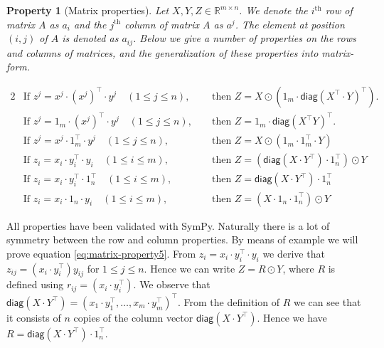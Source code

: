 \documentclass[twoside,11pt]{article}
\newtheorem{property}[theorem]{Property}
\newcommand{\func}[1]{\ensuremath{\textsf{#1}}} %
\newcommand{\Reals}{\mathbb{R}}
\begin{document}
\begin{property}[Matrix properties]
Let $X, Y, Z \in \Reals^{m \times n}$. We denote the $i^\text{th}$ row of matrix $A$ as $a_i$ and the $j^\text{th}$ column of matrix $A$ as $a^j$. The element at position $(i,j)$ of $A$ is denoted as $a_{ij}$. Below we give a number of properties on the rows and columns of matrices, and the generalization of these properties into matrix-form.

\begin{alignat}{2}
&\text{If }
  z^j = x^j \cdot (x^j)^\top \cdot y^j \quad (1 \leq j \leq n),
&&\text{ then }
  Z = X \odot (1_m \cdot \func{diag}(X^\top \cdot Y)^\top).
\label{eq:matrix-property1}
\\  
&\text{If }
  z^j = 1_m \cdot (x^j)^\top \cdot y^j \quad (1 \leq j \leq n),
&&\text{ then }
  Z = 1_m \cdot \func{diag}(X^\top Y)^\top.
\label{eq:matrix-property2}
\\  
&\text{If }
  z^j = x^j \cdot 1_m^\top \cdot y^j \quad (1 \leq j \leq n),
&&\text{ then }
  Z = X \odot (1_m \cdot 1_m^\top \cdot Y)
\label{eq:matrix-property3}
\\  
&\text{If }
  z_i = x_i \cdot y_i^\top \cdot y_i \quad (1 \leq i \leq m),
&&\text{ then }
  Z = (\func{diag}(X \cdot Y^\top) \cdot 1_n^\top) \odot Y
\label{eq:matrix-property5}
\\  
&\text{If }
  z_i = x_i \cdot y_i^\top \cdot 1_n^\top \quad (1 \leq i \leq m),
&&\text{ then }
  Z = \func{diag}(X \cdot Y^\top) \cdot 1_n^\top
\label{eq:matrix-property6}
\\  
&\text{If }
  z_i = x_i \cdot 1_n \cdot y_i \quad (1 \leq i \leq m),
&&\text{ then }
  Z = (X \cdot 1_n \cdot 1_n^\top) \odot Y
\label{eq:matrix-property7}
\end{alignat}
\end{property}

\noindent
All properties have been validated with SymPy. Naturally there is a lot of symmetry between the row and column properties. By means of example we will prove equation \eqref{eq:matrix-property5}. From $z_i = x_i \cdot y_i^\top \cdot y_i$ we derive that $z_{ij} = (x_i \cdot y_i^\top) y_{ij}$ for $1 \leq j \leq n$. Hence we can write $Z = R \odot Y$, where $R$ is defined using $r_{ij} = (x_i \cdot y_i^\top)$. We observe that $\func{diag}(X \cdot Y^\top) = (x_1 \cdot y_1^\top, \ldots, x_m \cdot y_m^\top)^\top$. From the definition of $R$ we can see that it consists of $n$ copies of the column vector $\func{diag}(X \cdot Y^\top)$. Hence we have $R = \func{diag}(X \cdot Y^\top) \cdot 1_n^\top$.
\end{document}
